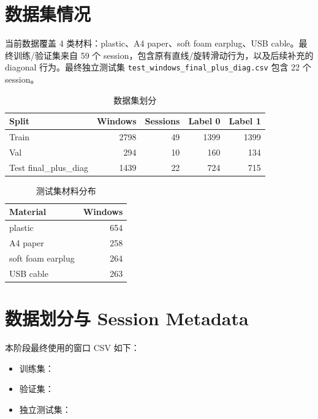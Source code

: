 \documentclass[UTF8,a4paper,11pt]{ctexart}
\begin{document}
\section{数据集情况}

当前数据覆盖 4 类材料：plastic、A4 paper、soft foam earplug、USB cable。最终训练/验证集来自 59 个 session，包含原有直线/旋转滑动行为，以及后续补充的 diagonal 行为。最终独立测试集 \texttt{test\_windows\_final\_plus\_diag.csv} 包含 22 个 session。

\begin{table}[h]
\centering
\caption{数据集划分}
\begin{tabular}{lrrrr}
\toprule
Split & Windows & Sessions & Label 0 & Label 1 \\
\midrule
Train & 2798 & 49 & 1399 & 1399 \\
Val & 294 & 10 & 160 & 134 \\
Test final\_plus\_diag & 1439 & 22 & 724 & 715 \\
\bottomrule
\end{tabular}
\end{table}

\begin{table}[h]
\centering
\caption{测试集材料分布}
\begin{tabular}{lr}
\toprule
Material & Windows \\
\midrule
plastic & 654 \\
A4 paper & 258 \\
soft foam earplug & 264 \\
USB cable & 263 \\
\bottomrule
\end{tabular}
\end{table}

\section{数据划分与 Session Metadata}

本阶段最终使用的窗口 CSV 如下：

\begin{itemize}
  \item 训练集：
  \item 验证集：
  \item 独立测试集：
\end{itemize}
\end{document}
